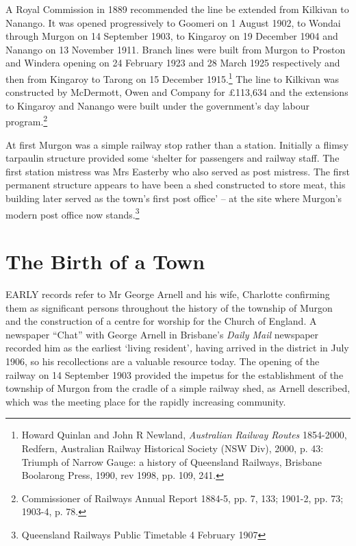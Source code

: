 A Royal Commission in 1889 recommended the line be extended from Kilkivan to Nanango. It was opened progressively to Goomeri on 1 August 1902, to Wondai through Murgon on 14 September 1903, to Kingaroy on 19 December 1904 and Nanango on 13 November 1911. Branch lines were built from Murgon to Proston and Windera opening on 24 February 1923 and 28 March 1925 respectively and then from Kingaroy to Tarong on 15 December 1915.\footnote{Howard Quinlan and John R Newland, \emph{Australian Railway Routes} 1854-2000, Redfern, Australian Railway Historical Society (NSW Div), 2000, p. 43: Triumph of Narrow Gauge: a history of Queensland Railways, Brisbane Boolarong Press, 1990, rev 1998, pp. 109, 241.} The line to Kilkivan was constructed by McDermott, Owen and Company for \pounds113,634 and the extensions to Kingaroy and Nanango were built under the government's day labour program.\footnote{Commissioner of Railways Annual Report 1884-5, pp. 7, 133; 1901-2, pp. 73; 1903-4, p. 78.}


At first Murgon was a simple railway stop rather than a station. Initially a flimsy tarpaulin structure provided some `shelter for passengers and railway staff. The first station mistress was Mrs Easterby who also served as post mistress. The first permanent structure appears to have been a shed constructed to store meat, this building later served as the town's first post office' -- at the site where Murgon's modern post office now stands.\footnote{Queensland Railways Public Timetable 4 February 1907}


\balance


\printendnotes[custom]
\setcounter{endnote}{0}
\chapter{The Birth of a Town}
\nobalance


\lettrine[lines=3]{E}{ARLY}
 records refer to Mr George Arnell and his wife, Charlotte confirming them as significant persons throughout the history of the township of Murgon and the construction of a centre for worship for the Church of England. A newspaper ``Chat'' with George Arnell in Brisbane's \emph{Daily Mail} newspaper recorded him as the earliest `living resident'\emph{,} having arrived in the district in July 1906, so his recollections are a valuable resource today. The opening of the railway on 14 September 1903 provided the impetus for the establishment of the township of Murgon from the cradle of a simple railway shed, as Arnell described, which was the meeting place for the rapidly increasing community.

